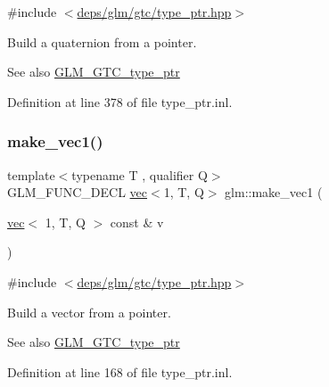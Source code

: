 {\ttfamily \#include $<$\hyperlink{type__ptr_8hpp}{deps/glm/gtc/type\+\_\+ptr.\+hpp}$>$}

Build a quaternion from a pointer. \begin{DoxySeeAlso}{See also}
\hyperlink{group__gtc__type__ptr}{G\+L\+M\+\_\+\+G\+T\+C\+\_\+type\+\_\+ptr} 
\end{DoxySeeAlso}


Definition at line 378 of file type\+\_\+ptr.\+inl.

\mbox{\label{group__gtc__type__ptr_ga4135f03f3049f0a4eb76545c4967957c}} 
\subsubsection{\texorpdfstring{make\+\_\+vec1()}{make\_vec1()}\hspace{0.1cm}{\footnotesize\ttfamily [1/4]}}
{\footnotesize\ttfamily template$<$typename T , qualifier Q$>$ \\
G\+L\+M\+\_\+\+F\+U\+N\+C\+\_\+\+D\+E\+CL \hyperlink{structglm_1_1vec}{vec}$<$1, T, Q$>$ glm\+::make\+\_\+vec1 (\begin{DoxyParamCaption}\item[{\hyperlink{structglm_1_1vec}{vec}$<$ 1, T, Q $>$ const \&}]{v }\end{DoxyParamCaption})\hspace{0.3cm}{\ttfamily [inline]}}



{\ttfamily \#include $<$\hyperlink{type__ptr_8hpp}{deps/glm/gtc/type\+\_\+ptr.\+hpp}$>$}

Build a vector from a pointer. \begin{DoxySeeAlso}{See also}
\hyperlink{group__gtc__type__ptr}{G\+L\+M\+\_\+\+G\+T\+C\+\_\+type\+\_\+ptr} 
\end{DoxySeeAlso}


Definition at line 168 of file type\+\_\+ptr.\+inl.

\mbox{\label{group__gtc__type__ptr_ga13c92b81e55f201b052a6404d57da220}} 
